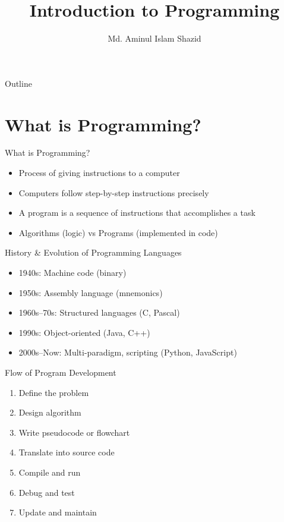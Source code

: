 \documentclass[12pt, aspectratio=169]{beamer}
\title{Introduction to Programming}
\author{Md. Aminul Islam Shazid}
\date{}
\begin{document}
    {
		\addtocounter{framenumber}{-2}    %

		\begin{frame}
			\titlepage
		\end{frame}

		\begin{frame}{Outline}
            \vfill
			\tableofcontents[subsectionstyle=hide]
            \vfill
		\end{frame}
	}


    \section{What is Programming?}

    \begin{frame}{What is Programming?}
        \begin{itemize}
            \item Process of giving instructions to a computer
            \item Computers follow step-by-step instructions precisely
            \item A program is a sequence of instructions that accomplishes a task
            \item Algorithms (logic) vs Programs (implemented in code)
        \end{itemize}
    \end{frame}


    \begin{frame}{History \& Evolution of Programming Languages}
        \begin{itemize}
            \item 1940s: Machine code (binary)
            \item 1950s: Assembly language (mnemonics)
            \item 1960s--70s: Structured languages (C, Pascal)
            \item 1990s: Object-oriented (Java, C++)
            \item 2000s--Now: Multi-paradigm, scripting (Python, JavaScript)
        \end{itemize}
    \end{frame}


    \begin{frame}{Flow of Program Development}
        \begin{enumerate}
            \item Define the problem
            \item Design algorithm
            \item Write pseudocode or flowchart
            \item Translate into source code
            \item Compile and run
            \item Debug and test
            \item Update and maintain
        \end{enumerate}
    \end{frame}
\end{document}
